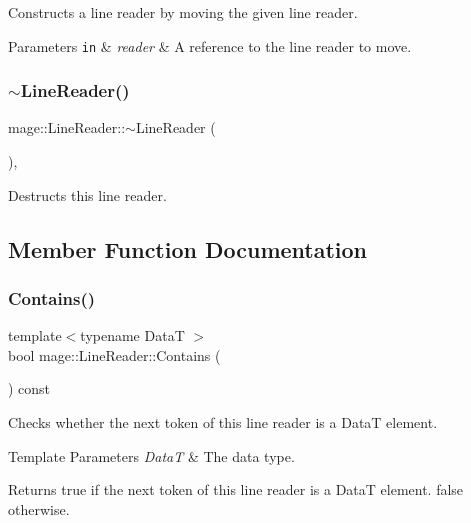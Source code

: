 Constructs a line reader by moving the given line reader.


\begin{DoxyParams}[1]{Parameters}
\mbox{\tt in}  & {\em reader} & A reference to the line reader to move. \\
\hline
\end{DoxyParams}
\hypertarget{classmage_1_1_line_reader_ad9753ea392ebe5b3867852d3392fb1e7}{}\label{classmage_1_1_line_reader_ad9753ea392ebe5b3867852d3392fb1e7} 
\subsubsection{\texorpdfstring{$\sim$\+Line\+Reader()}{~LineReader()}}
{\footnotesize\ttfamily mage\+::\+Line\+Reader\+::$\sim$\+Line\+Reader (\begin{DoxyParamCaption}{ }\end{DoxyParamCaption})\hspace{0.3cm}{\ttfamily [protected]}, {\ttfamily [default]}}

Destructs this line reader. 

\subsection{Member Function Documentation}
\hypertarget{classmage_1_1_line_reader_a3401db2b0ecd15d8048a1b321eceb77a}{}\label{classmage_1_1_line_reader_a3401db2b0ecd15d8048a1b321eceb77a} 
\subsubsection{\texorpdfstring{Contains()}{Contains()}}
{\footnotesize\ttfamily template$<$typename DataT $>$ \\
bool mage\+::\+Line\+Reader\+::\+Contains (\begin{DoxyParamCaption}{ }\end{DoxyParamCaption}) const\hspace{0.3cm}{\ttfamily [protected]}}

Checks whether the next token of this line reader is a {\ttfamily DataT} element.


\begin{DoxyTemplParams}{Template Parameters}
{\em DataT} & The data type. \\
\hline
\end{DoxyTemplParams}
\begin{DoxyReturn}{Returns}
{\ttfamily true} if the next token of this line reader is a {\ttfamily DataT} element. {\ttfamily false} otherwise. 
\end{DoxyReturn}
\hypertarget{classmage_1_1_line_reader_a0369e06fa3b38ecb22ffd5892759225f}{}\label{classmage_1_1_line_reader_a0369e06fa3b38ecb22ffd5892759225f} 
